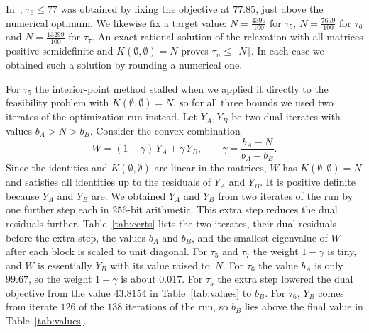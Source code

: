\documentclass[11pt]{amsart}
\theoremstyle{remark}
\begin{document}
In~\cite[Section~5.2]{LLM}, $\tau_6\le77$ was obtained by fixing the objective at $77.85$, just above the numerical optimum. We likewise fix a target value: $N=\frac{4399}{100}$ for $\tau_5$, $N=\frac{7699}{100}$ for $\tau_6$ and $N=\frac{13299}{100}$ for $\tau_7$. An exact rational solution of the relaxation with all matrices positive semidefinite and $K(\emptyset,\emptyset)=N$ proves $\tau_n\le\lfloor N\rfloor$. In each case we obtained such a solution by rounding a numerical one.

For $\tau_5$ the interior-point method stalled when we applied it directly to the feasibility problem with $K(\emptyset,\emptyset)=N$, so for all three bounds we used two iterates of the optimization run instead. Let $Y_A,Y_B$ be two dual iterates with values $b_A>N>b_B$. Consider the convex combination
\[
W=(1-\gamma)\,Y_A+\gamma\,Y_B,\qquad \gamma=\frac{b_A-N}{b_A-b_B}.
\]
Since the identities and $K(\emptyset,\emptyset)$ are linear in the matrices, $W$ has $K(\emptyset,\emptyset)=N$ and satisfies all identities up to the residuals of $Y_A$ and $Y_B$. It is positive definite because $Y_A$ and $Y_B$ are. We obtained $Y_A$ and $Y_B$ from two iterates of the run by one further step each in $256$-bit arithmetic. This extra step reduces the dual residuals further. Table~\ref{tab:certs} lists the two iterates, their dual residuals before the extra step, the values $b_A$ and $b_B$, and the smallest eigenvalue of $W$ after each block is scaled to unit diagonal. For $\tau_5$ and $\tau_7$ the weight $1-\gamma$ is tiny, and $W$ is essentially $Y_B$ with its value raised to~$N$. For $\tau_6$ the value $b_A$ is only $99.67$, so the weight $1-\gamma$ is about $0.017$. For $\tau_5$ the extra step lowered the dual objective from the value $43.8154$ in Table~\ref{tab:values} to $b_B$. For $\tau_6$, $Y_B$ comes from iterate $126$ of the $138$ iterations of the run, so $b_B$ lies above the final value in Table~\ref{tab:values}.
\end{document}
